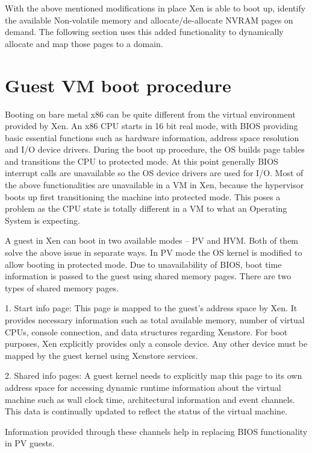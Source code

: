 With the above mentioned modifications in place Xen is able to boot up, identify the available Non-volatile memory and allocate/de-allocate NVRAM pages on demand. The following section uses this added functionality to dynamically allocate and map those pages to a domain. 

 

\section{Guest VM boot procedure}

Booting on bare metal x86 can be quite different from the virtual environment provided by Xen. An x86 CPU starts in 16 bit real mode, with BIOS providing basic essential functions such as hardware information, address space resolution and I/O device drivers. During the boot up procedure, the OS builds page tables and transitions the CPU to protected mode. At this point generally BIOS interrupt calls are unavailable so the OS device drivers are used for I/O. Most of the above functionalities are unavailable in a VM in Xen, because the hypervisor boots up first transitioning the machine into protected mode. This poses a problem as the CPU state is totally different in a VM to what an Operating System is expecting. 

 

A guest in Xen can boot in two available modes – PV and HVM. Both of them solve the above issue in separate ways. In PV mode the OS kernel is modified to allow booting in protected mode. Due to unavailability of BIOS, boot time information is passed to the guest using shared memory pages. There are two types of shared memory pages. 

1. Start info page: This page is mapped to the guest’s address space by Xen. It provides necessary information such as total available memory, number of virtual CPUs, console connection, and data structures regarding Xenstore. For boot purposes, Xen explicitly provides only a console device. Any other device must be mapped by the guest kernel using Xenstore services.  

2. Shared info pages: A guest kernel needs to explicitly map this page to its own address space for accessing dynamic runtime information about the virtual machine such as wall clock time, architectural information and event channels. This data is continually updated to reflect the status of the virtual machine. 

 

Information provided through these channels help in replacing BIOS functionality in PV guests. 

